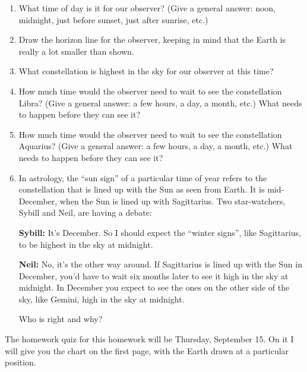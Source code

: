 \documentclass[12pt]{article}
\begin{document}
\begin{enumerate}
	

	\item What time of day is it for our observer? (Give a general answer: noon, midnight, just before sunset, just after sunrise, etc.)
	\vspace{1em}


\item Draw the horizon line for the observer, keeping in mind that the Earth is really a lot smaller than shown.

	\item What constellation is highest in the sky for our observer at this time?
	
	\vspace{0.5in}
	
	\item How much time would the observer need to wait to see the constellation Libra? (Give a general answer: a few hours, a day, a month, etc.) What needs to happen before they can see it?
	
	\vspace{0.8in}
	
	\item How much time would the observer need to wait to see the constellation Aquarius? (Give a general answer: a few hours, a day, a month, etc.) What needs to happen before they can see it?
	
	\vspace{0.8in}
	
	\item In astrology, the ``sun sign'' of a particular time of year refers to the constellation that is lined up with the Sun as seen from Earth. It is mid-December, when the Sun is lined up with Sagittarius. Two star-watchers, Sybill and Neil, are having a debate:
	
	{\bf Sybill:} It's December. So I should expect the ``winter signs'', like Sagittarius, to be highest in the sky at midnight.
	
	{\bf Neil:} No, it's the other way around. If Sagittarius is lined up with the Sun in December, you'd have to wait six months later to see it high in the sky at midnight. In December you expect to see the ones on the other side of the sky, like Gemini, high in the sky at midnight.
	
	Who is right and why?
	
\end{enumerate}
\begin{center} \underline {\hspace{4in}} \end{center}
The homework quiz for this homework will be Thursday, September 15. On it I will give you the chart on the first page, with the Earth drawn at a particular position.
\end{document}
